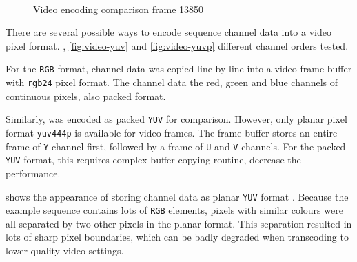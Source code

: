 \begin{figure}[t]
{  \label{fig:video-420}}\hfil
  \hfil
  \\
  \caption{\footnotesize Video encoding  comparison  frame 13850}
  \label{fig:video-pix_fmt}
\end{figure}

There are several possible ways to encode sequence channel data into a video pixel format. , \ref{fig:video-yuv} and \ref{fig:video-yuvp}  different channel orders tested.

For the \texttt{RGB} format, channel data was copied line-by-line into a video frame buffer with \texttt{rgb24} pixel format. The channel data  the red, green and blue channels of continuous pixels, also  packed format.

Similarly,  was encoded as packed \texttt{YUV} for comparison. However, only  planar pixel format \texttt{yuv444p} is available for video frames. The frame buffer stores an entire frame of \texttt{Y} channel first, followed by a frame of \texttt{U} and \texttt{V} channels. For the packed \texttt{YUV} format, this requires  complex buffer copying routine,   decrease the performance.

 shows the appearance of storing channel data as planar \texttt{YUV} format . Because the example sequence contains lots of \texttt{RGB} elements, pixels with similar colours were all separated by two other pixels in the planar format. This separation resulted in lots of sharp pixel boundaries, which can be badly degraded when transcoding to lower quality video settings.

